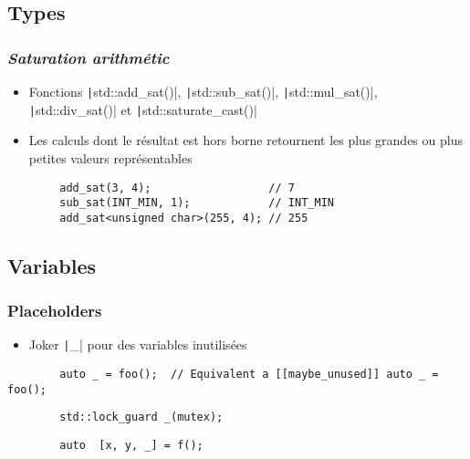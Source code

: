 \documentclass[C++.tex]{subfiles}
\begin{document}
\subsection*{Types}
\begin{frame}[fragile]
	\frametitle{\textit{Saturation arithmétic}}
	\begin{itemize}
		\item Fonctions \texttt|std::add_sat()|, \texttt|std::sub_sat()|, \texttt|std::mul_sat()|, \texttt|std::div_sat()| et \texttt|std::saturate_cast()|
		\item Les calculs dont le résultat est hors borne retournent les plus grandes ou plus petites valeurs représentables
	\end{itemize}

	\begin{verbatim}
		add_sat(3, 4);                  // 7
		sub_sat(INT_MIN, 1);            // INT_MIN
		add_sat<unsigned char>(255, 4); // 255
	\end{verbatim}

\end{frame}

\subsection*{Variables}
\begin{frame}[fragile]
	\frametitle{Placeholders}
	\begin{itemize}
		\item Joker \texttt|_| pour des variables inutilisées
	\end{itemize}

	\begin{verbatim}
		auto _ = foo();  // Equivalent a [[maybe_unused]] auto _ = foo();
	\end{verbatim}

	\begin{verbatim}
		std::lock_guard _(mutex);
	\end{verbatim}

	\begin{verbatim}
		auto  [x, y, _] = f();
	\end{verbatim}

\end{frame}
\end{document}
